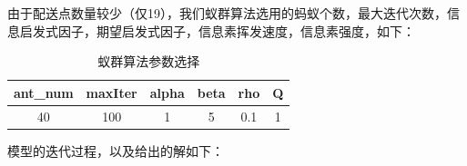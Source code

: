 \documentclass{cumcmthesis}
\begin{document}
    由于配送点数量较少（仅19），我们蚁群算法选用的蚂蚁个数，最大迭代次数，信息启发式因子，期望启发式因子，信息素挥发速度，信息素强度，如下：

    \begin{table}[!htbp]
        \caption{蚁群算法参数选择}\label{tab:001} 
        \centering
        \begin{tabular}{cccccc}
            \toprule[1.5pt]
            ant\_num & maxIter & alpha & beta & rho & Q \\
            \midrule[1pt]
            40       & 100     & 1     & 5    & 0.1 & 1 \\
            \bottomrule[1.5pt]
        \end{tabular}
    \end{table}
    
    模型的迭代过程，以及给出的解如下：
\end{document}
